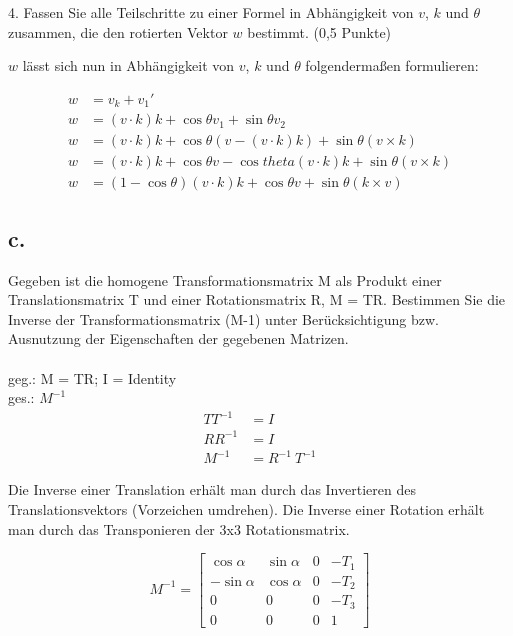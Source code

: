 \documentclass[12pt]{scrreprt}
\begin{document}
4. Fassen Sie alle Teilschritte zu einer Formel in Abhängigkeit von $v$, $k$ und $\theta$ zusammen, die den
rotierten Vektor $w$ bestimmt. (0,5 Punkte)

$w$ lässt sich nun in Abhängigkeit von $v$, $k$ und $\theta$ folgendermaßen formulieren:

\begin{align*}
	w &= v_k + v_1'\\
	w &= (v \cdot k)k + \cos{\theta} v_1 + \sin{\theta} v_2\\
	w &= (v \cdot k)k + \cos{\theta} (v - (v \cdot k)k) + \sin{\theta} (v \times k)\\
	w &= (v \cdot k)k + \cos{\theta}v - \cos{theta}(v \cdot k)k + \sin{\theta}(v \times k)\\
	w &= (1 - \cos{\theta})(v \cdot k)k + \cos{\theta}v + \sin{\theta}(k \times v)
\end{align*}

\subsection*{c.}

Gegeben ist die homogene Transformationsmatrix M als Produkt einer Translationsmatrix T und einer
Rotationsmatrix R, M = TR. Bestimmen Sie die Inverse der Transformationsmatrix (M-1) unter
Berücksichtigung bzw. Ausnutzung der Eigenschaften der gegebenen Matrizen.\\
\\
geg.: M = TR; I = Identity\\
ges.: $M^{-1}$ \\

\begin{align*}
	TT^{-1} &= I \\
	RR^{-1} &= I \\
	M^{-1} &= R^{-1} ~ T^{-1}
\end{align*}

Die Inverse einer Translation erhält man durch das Invertieren des Translationsvektors (Vorzeichen umdrehen).
Die Inverse einer Rotation erhält man durch das Transponieren der 3x3 Rotationsmatrix.

\[
 M^{-1} = \begin{bmatrix}
       \cos \alpha & \sin\alpha & 0 & -T_1 \\[0.3em]
       -\sin\alpha & \cos\alpha & 0 & -T_2 \\[0.3em]
       0           & 0          & 0 & -T_3 \\[0.3em]
       0           & 0          & 0 & 1
     \end{bmatrix}
\]
\end{document}
